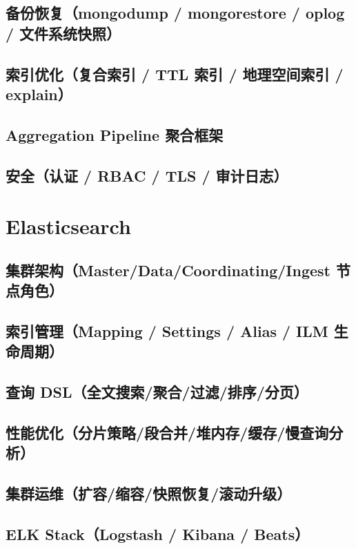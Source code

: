 \documentclass[12pt,UTF8]{ctexbook}
\begin{document}
  \section{备份恢复（mongodump / mongorestore / oplog / 文件系统快照）}
  \section{索引优化（复合索引 / TTL 索引 / 地理空间索引 / explain）}
  \section{Aggregation Pipeline 聚合框架}
  \section{安全（认证 / RBAC / TLS / 审计日志）}

\chapter{Elasticsearch}
\label{chap:elasticsearch}

  \section{集群架构（Master/Data/Coordinating/Ingest 节点角色）}
  \section{索引管理（Mapping / Settings / Alias / ILM 生命周期）}
  \section{查询 DSL（全文搜索/聚合/过滤/排序/分页）}
  \section{性能优化（分片策略/段合并/堆内存/缓存/慢查询分析）}
  \section{集群运维（扩容/缩容/快照恢复/滚动升级）}
  \section{ELK Stack（Logstash / Kibana / Beats）}

\end{document}
